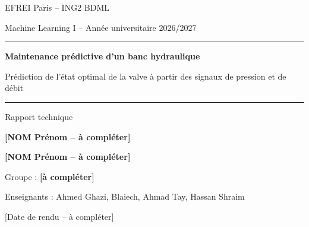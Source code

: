 \documentclass[11pt,a4paper]{article}
\begin{document}
\begin{titlepage}
  \centering
  {\large EFREI Paris -- ING2 BDML \par}
  {\large Machine Learning I -- Année universitaire 2026/2027\par}
  \vspace{3cm}
  {\rule{\linewidth}{0.6pt}\par\vspace{0.6cm}}
  {\Huge\bfseries Maintenance prédictive d'un banc hydraulique\par}
  \vspace{0.4cm}
  {\Large Prédiction de l'état optimal de la valve à partir des signaux de pression et de débit\par}
  \vspace{0.6cm}
  {\rule{\linewidth}{0.6pt}\par}
  \vspace{2.5cm}
  {\large Rapport technique\par}
  \vspace{1.5cm}
  {\large\textbf{[NOM Prénom -- à compléter]}\par
          \textbf{[NOM Prénom -- à compléter]}\par
          Groupe : \textbf{[à compléter]}\par}
  \vspace{1.5cm}
  {Enseignants : Ahmed Ghazi, Blaiech, Ahmad Tay, Hassan Shraim\par}
  \vfill
  {\large [Date de rendu -- à compléter]\par}
\end{titlepage}
\end{document}
